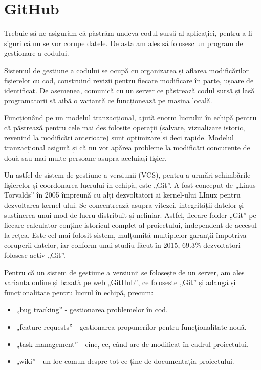 \section{GitHub}
	Trebuie să ne asigurăm că păstrăm undeva codul sursă al aplicației, pentru a fi siguri că nu se vor corupe datele.
	De asta am ales să folosesc un program de gestionare a codului.\cite{mercurial}

	Sistemul de gestiune a codului se ocupă cu organizarea și aflarea modificărilor fișierelor cu cod, construind revizii pentru fiecare modificare în parte, ușoare de identificat.
	De asemenea, comunică cu un server ce păstrează codul sursă și lasă programatorii să aibă o variantă ce funcționează pe mașina locală.

	Funcționând pe un modelul tranzacțional, ajută enorm lucrului în echipă pentru că păstrează pentru cele mai des folosite operații (salvare, vizualizare istoric, revenind la modificări anterioare) sunt optimizare și deci rapide.
	Modelul tranzacțional asigură și că nu vor apărea probleme la modificări concurente de două sau mai multe persoane asupra aceluiași fișier.

	Un astfel de sistem de gestiune a versiunii (VCS), pentru a urmări schimbările fișierelor și coordonarea lucrului în echipă, este „Git”.\cite{git}
	A fost conceput de „Linus Torvalds” în 2005 împreună cu alți dezvoltatori ai kernel-ului LInux pentru dezvoltarea kernel-ului.
	Se concentrează asupra vitezei, integrității datelor și susținerea unui mod de lucru distribuit și neliniar.
	Astfel, fiecare folder „Git” pe fiecare calculator conține istoricul complet al proiectului, independent de accesul la rețea.
	Este cel mai folosit sistem, mulțumită multiplelor garanții împotriva coruperii datelor, iar conform unui studiu făcut în 2015, 69.3\% dezvoltatori folosesc activ „Git”.

	Pentru că un sistem de gestiune a versiunii se folosește de un server, am ales varianta online și bazată pe web „GitHub”, ce folosește „Git” și adaugă și funcționalitate pentru lucrul în echipă, precum: \begin{itemize}
		\item „bug tracking” - gestionarea problemelor în cod.
		\item „feature requests” - gestionarea propunerilor pentru funcționalitate nouă.
		\item „task management” - cine, ce, când are de modificat în cadrul proiectului.
		\item „wiki” - un loc comun despre tot ce ține de documentația proiectului.
	\end{itemize}
	\cite{github}

